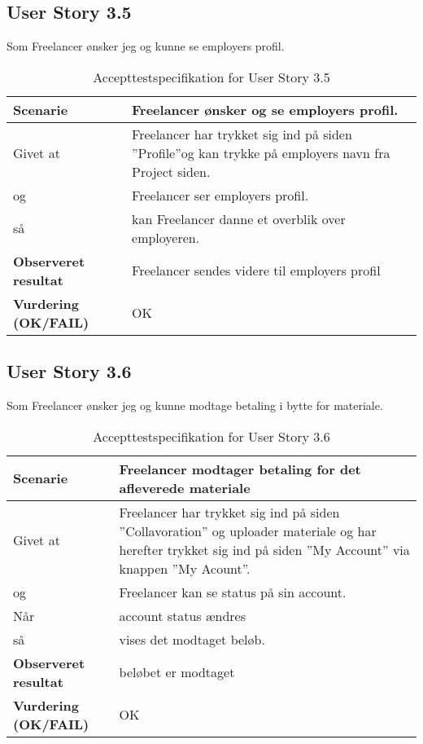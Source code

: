 \subsection{User Story 3.5}
Som Freelancer ønsker jeg og kunne se employers profil.

\begin{table}[H]
	\centering
	\caption{Accepttestspecifikation for User Story 3.5}
	\begin{tabular}{p{8cm}|p{8cm}}
		\hline
		\textbf{Scenarie} & Freelancer ønsker og se employers profil.\\[10px]
		\hline
		Givet at & Freelancer har trykket sig ind på siden ''Profile''og kan trykke på employers navn fra Project siden.\\
        \hline
        og & Freelancer ser employers profil.\\
        \hline
        så &  kan Freelancer danne et overblik over employeren.\\
		\hline
		\rowcolor{white}
		\textbf{Observeret resultat} & Freelancer sendes videre til employers profil\\
		\hline
		\textbf{Vurdering (OK/FAIL)} & OK\\
		\hline
	\end{tabular}
\end{table}

\subsection{User Story 3.6}
Som Freelancer ønsker jeg og kunne modtage betaling i bytte for materiale.


\begin{table}[H]
	\centering
	\caption{Accepttestspecifikation for User Story 3.6}
	\begin{tabular}{p{6cm}|p{6cm}}
		\hline
		\textbf{Scenarie} & Freelancer modtager betaling for det afleverede materiale\\[10px]
		\hline
		Givet at & Freelancer har trykket sig ind på siden ''Collavoration'' og uploader materiale og har herefter trykket sig ind på siden ''My Account'' via knappen ''My Acount''.\\
        \hline
        og & Freelancer kan se status på sin account.\\
        \hline
        Når & account status ændres\\
        \hline
        så & vises det modtaget beløb.\\
		\hline
		\rowcolor{white}
		\textbf{Observeret resultat} & beløbet er modtaget\\
		\hline
		\textbf{Vurdering (OK/FAIL)} & OK\\
		\hline
	\end{tabular}
\end{table}